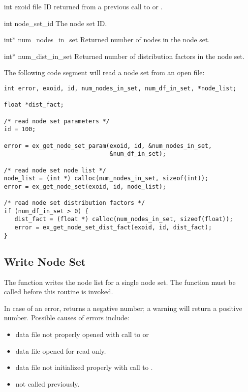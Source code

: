 \begin{parameters}
\item[{int exoid \R{}}]
\exo{} file ID returned from a previous call to 
or .

\item[{int node_set_id \R{}}]
The node set ID.

\item[{int* num_nodes_in_set \W{}}]
Returned number of nodes in the node set.

\item[{int* num_dist_in_set \W{}}]
Returned number of distribution factors in the node set.
\end{parameters}

The following code segment will read a node set from an open
\exo{} file:
\begin{lstlisting}
int error, exoid, id, num_nodes_in_set, num_df_in_set, *node_list;

float *dist_fact;

/* read node set parameters */
id = 100;

error = ex_get_node_set_param(exoid, id, &num_nodes_in_set,
                              &num_df_in_set);

/* read node set node list */
node_list = (int *) calloc(num_nodes_in_set, sizeof(int));
error = ex_get_node_set(exoid, id, node_list);

/* read node set distribution factors */
if (num_df_in_set > 0) {
   dist_fact = (float *) calloc(num_nodes_in_set, sizeof(float));
   error = ex_get_node_set_dist_fact(exoid, id, dist_fact);
}
\end{lstlisting}

\subsection{Write Node Set}

The function  writes the node list for a
single node set. The function  must
be called before this routine is invoked.

In case of an error,  returns a negative
number; a warning will return a positive number.
Possible causes of errors include:

\begin{itemize}
 \item data file not properly opened with call to 
or 

 \item data file opened for read only.

 \item data file not initialized properly with call to .

 \item {} not called previously.
\end{itemize}

